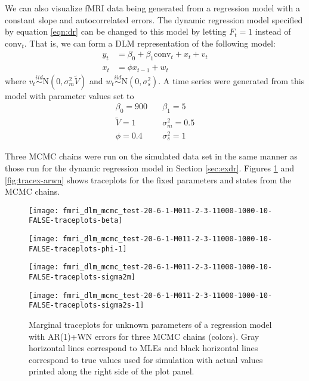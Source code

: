 \documentclass{article}
\begin{document}
We can also visualize fMRI data being generated from a regression model with a constant slope and autocorrelated errors. The dynamic regression model specified by equation \eqref{eqn:dr} can be changed to this model by letting $F_t = 1$ instead of $\mbox{conv}_t$. That is, we can form a DLM representation of the following model:
\begin{align*}
y_t &= \beta_0 + \beta_1\mbox{conv}_t + x_t + v_t \\
x_t &= \phi x_{t-1} + w_t
\end{align*}
\noindent where $v_t \stackrel{iid}{\sim} \mbox{N}(0,\sigma^2_m\tilde{V})$ and $w_t \stackrel{iid}{\sim} \mbox{N}(0,\sigma^2_s)$. A time series were generated from this model with parameter values set to
\begin{align*}
\beta_0 = 900 &\quad \beta_1 = 5 \\
\tilde{V} = 1 &\quad \sigma_m^2 = 0.5 \\
\phi = 0.4 &\quad \sigma_s^2 = 1
\end{align*}

Three MCMC chains were run on the simulated data set in the same manner as those run for the dynamic regression model in Section \ref{sec:exdr}. Figures \ref{fig:tracetheta-arwn} and \ref{fig:tracex-arwn} shows traceplots for the fixed parameters and states from the MCMC chains.

\begin{figure}[ht]
\begin{minipage}{0.5\linewidth}
\texttt{[image: fmri\_dlm\_mcmc\_test-20-6-1-M011-2-3-11000-1000-10-FALSE-traceplots-beta]}
\end{minipage}
\begin{minipage}{0.5\linewidth}
\texttt{[image: fmri\_dlm\_mcmc\_test-20-6-1-M011-2-3-11000-1000-10-FALSE-traceplots-phi-1]}
\end{minipage}
\begin{minipage}{0.5\linewidth}
\texttt{[image: fmri\_dlm\_mcmc\_test-20-6-1-M011-2-3-11000-1000-10-FALSE-traceplots-sigma2m]}
\end{minipage}
\begin{minipage}{0.5\linewidth}
\texttt{[image: fmri\_dlm\_mcmc\_test-20-6-1-M011-2-3-11000-1000-10-FALSE-traceplots-sigma2s-1]}
\end{minipage}
\caption{Marginal traceplots for unknown parameters of a regression model with AR(1)+WN errors for three MCMC chains (colors). Gray horizontal lines correspond to MLEs and black horizontal lines correspond to true values used for simulation with actual values printed along the right side of the plot panel.} \label{fig:tracetheta-arwn}
\end{figure}
\end{document}
